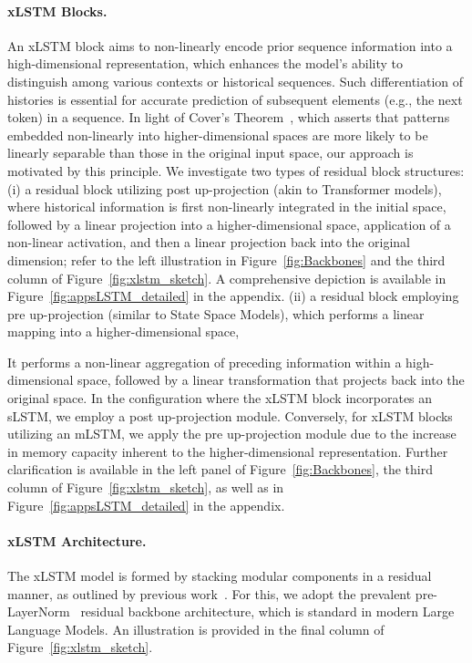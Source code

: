 \paragraph{xLSTM Blocks.}
\label{sec:xLSTMblock}
An xLSTM block aims to non-linearly encode prior sequence information into a high-dimensional representation, which enhances the model's ability to distinguish among various contexts or historical sequences. Such differentiation of histories is essential for accurate prediction of subsequent elements (e.g., the next token) in a sequence. In light of Cover’s Theorem~\citep{Cover:65}, which asserts that patterns embedded non-linearly into higher-dimensional spaces are more likely to be linearly separable than those in the original input space, our approach is motivated by this principle. We investigate two types of residual block structures: (i) a residual block utilizing post up-projection (akin to Transformer models), where historical information is first non-linearly integrated in the initial space, followed by a linear projection into a higher-dimensional space, application of a non-linear activation, and then a linear projection back into the original dimension; refer to the left illustration in Figure~\ref{fig:Backbones} and the third column of Figure~\ref{fig:xlstm_sketch}. A comprehensive depiction is available in Figure~\ref{fig:appsLSTM_detailed} in the appendix. (ii) a residual block employing pre up-projection (similar to State Space Models), which performs a linear mapping into a higher-dimensional space,

It performs a non-linear aggregation of preceding information within a high-dimensional space, followed by a linear transformation that projects back into the original space. In the configuration where the xLSTM block incorporates an sLSTM, we employ a post up-projection module. Conversely, for xLSTM blocks utilizing an mLSTM, we apply the pre up-projection module due to the increase in memory capacity inherent to the higher-dimensional representation. Further clarification is available in the left panel of Figure~\ref{fig:Backbones}, the third column of Figure~\ref{fig:xlstm_sketch}, as well as in Figure~\ref{fig:appsLSTM_detailed} in the appendix.

\paragraph{xLSTM Architecture. }
\label{sec:xLSTMarchitecure}
The xLSTM model is formed by stacking modular components in a residual manner, as outlined by previous work~\citep{Srivastava:15,He:16}. For this, we adopt the prevalent pre-LayerNorm~\citep{Ba:16b} residual backbone architecture, which is standard in modern Large Language Models. An illustration is provided in the final column of Figure~\ref{fig:xlstm_sketch}.

